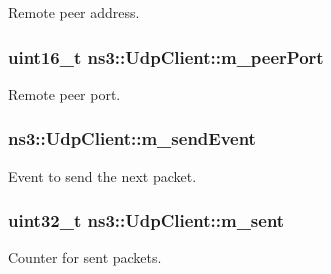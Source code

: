 Remote peer address. 

\subsubsection[{\texorpdfstring{m\+\_\+peer\+Port}{m_peerPort}}]{\setlength{\rightskip}{0pt plus 5cm}uint16\+\_\+t ns3\+::\+Udp\+Client\+::m\+\_\+peer\+Port\hspace{0.3cm}{\ttfamily [private]}}\hypertarget{classns3_1_1UdpClient_a76a73f60bb2454a6838a5f2315dd2842}{}\label{classns3_1_1UdpClient_a76a73f60bb2454a6838a5f2315dd2842}


Remote peer port. 

\subsubsection[{\texorpdfstring{m\+\_\+send\+Event}{m_sendEvent}}]{ ns3\+::\+Udp\+Client\+::m\+\_\+send\+Event\hspace{0.3cm}{\ttfamily [private]}}\hypertarget{classns3_1_1UdpClient_a8e04e0d68fac224d18f150e906019f7c}{}\label{classns3_1_1UdpClient_a8e04e0d68fac224d18f150e906019f7c}


Event to send the next packet. 

\subsubsection[{\texorpdfstring{m\+\_\+sent}{m_sent}}]{\setlength{\rightskip}{0pt plus 5cm}uint32\+\_\+t ns3\+::\+Udp\+Client\+::m\+\_\+sent\hspace{0.3cm}{\ttfamily [private]}}\hypertarget{classns3_1_1UdpClient_a3bec0cbaaf2ed40d429d1c0110fa7681}{}\label{classns3_1_1UdpClient_a3bec0cbaaf2ed40d429d1c0110fa7681}


Counter for sent packets. 


